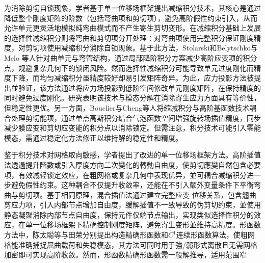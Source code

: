 为消除剪切自锁现象，学者基于单一位移场框架提出减缩积分技术\cite{zienkiewicz1971, kreja1988, cheng1997}，其核心是通过降低整个刚度矩阵的阶数（包括弯曲项和剪切项），避免高阶假性约束引入，从而允许单元更灵活地模拟纯弯曲模式而不产生寄生剪切变形。在减缩积分基础上发展的选择性减缩积分则将弯曲和剪切项分开处理\cite{hughes1977, zhang2018, bouclier2012}：对弯曲项使用完整积分保证刚度精度，对剪切项使用减缩积分消除自锁现象。基于此方法，Stolarski和Belytschko\cite{belytschko1985}与 Melo 等人\cite{demelo1992}针对曲单元与弯管结构，通过局部降阶积分方案减少高阶应变项的积分点，规避复杂几何下的锁闭风险。然而选择性减缩积分可能导致单元过度刚化而精度下降，而均匀减缩积分虽精度较好却易引发矩阵奇异。为此，应力投影方法被提出並验证\cite{sun2025, belytschko1985, elguedj2007, wriggers2023, dvorakova2022}，该方法通过将应力场投影到低阶空间修改单元刚度矩阵，在保持精度的同时避免过度刚化。研究表明该技术与模态分解在消除寄生应力方面具有等价性，但稳定性更优。另一方面，Bouclier\cite{bouclier2012}与Cheng等人\cite{cheng1997}将缩减积分与高阶基函数技术耦合处理剪切能项，通过单点高斯积分结合气泡函数空间增强旋转场插值精度，同步减少膜应变和剪切应变能的积分点以消除锁定。但需注意，积分技术可能引入零能模态，需通过稳定化方法修正以维持解的稳定性和精度。

鉴于积分技术对网格取向敏感，学者提出了改进的单一位移场框架方法。高阶插值法透過提升階數或引入厚度方向二次變化的轉動自由度，使剪切應變自然包含必要項\cite{li1990, tai2016, koziey1994, dawe1974}，有效减轻锁定效应，在粗网格或复杂几何中表现优异，並可耦合减缩积分进一步避免假性约束。这种耦合不仅提升收敛率，还能在不引入额外变量条件下平衡弯曲与剪切项。基于相同原理，混合插值法通过建立完整应变-位移关系，包含翘曲剪应力项，引入内部节点增加自由度，缓解插值不一致导致的伪剪切约束，並使用静态凝聚消除内部节点自由度，保持元件仅端节点输出\cite{schnabl2007, wang2014}，实现类似选择性积分的效应，在单一位移场框架下精确控制刚度矩阵，避免寄生变形並维持高精度。形函数方法中，陈太聪等\cite{LXXB200906019}与田荣\cite{LXXB201901027}分别提出构造精确形函数和$C^1$连续形函数算法，使粗网格能准确捕捉屈曲载荷和失稳模态，其方法可同时用于強/弱形式离散且无需网格加密即可实现高阶收敛。然而，形函数精确形函数需一般解推导，适用范围窄

